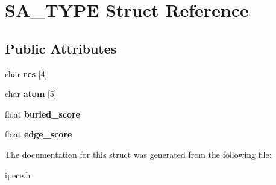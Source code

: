 \hypertarget{struct_s_a___t_y_p_e}{\section{S\-A\-\_\-\-T\-Y\-P\-E Struct Reference}
\label{struct_s_a___t_y_p_e}
}
\subsection*{Public Attributes}
\begin{DoxyCompactItemize}
\item 
\hypertarget{struct_s_a___t_y_p_e_a7285900f9d531dc78dbd98b59ba64dfb}{char {\bfseries res} \mbox{[}4\mbox{]}}\label{struct_s_a___t_y_p_e_a7285900f9d531dc78dbd98b59ba64dfb}

\item 
\hypertarget{struct_s_a___t_y_p_e_a20ad2cf513773191fae2d30ec6afa7f1}{char {\bfseries atom} \mbox{[}5\mbox{]}}\label{struct_s_a___t_y_p_e_a20ad2cf513773191fae2d30ec6afa7f1}

\item 
\hypertarget{struct_s_a___t_y_p_e_aac4f5baedd9a5fefd9a068e8b2e29422}{float {\bfseries buried\-\_\-score}}\label{struct_s_a___t_y_p_e_aac4f5baedd9a5fefd9a068e8b2e29422}

\item 
\hypertarget{struct_s_a___t_y_p_e_aedf6a15072e9d18fd5f618deaa1a050a}{float {\bfseries edge\-\_\-score}}\label{struct_s_a___t_y_p_e_aedf6a15072e9d18fd5f618deaa1a050a}

\end{DoxyCompactItemize}


The documentation for this struct was generated from the following file\-:\begin{DoxyCompactItemize}
\item 
ipece.\-h\end{DoxyCompactItemize}
